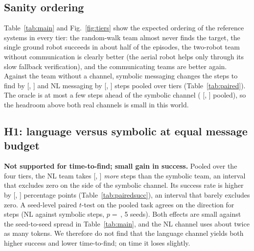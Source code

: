 \subsection{Sanity ordering}
Table~\ref{tab:main} and Fig.~\ref{fig:tiers} show the expected ordering of the reference systems in every tier: the random-walk team almost never finds the target, the single ground robot succeeds in about half of the episodes, the two-robot team without communication is clearly better (the aerial robot helps only through its slow fallback verification), and the communicating teams are better again. Against the team without a channel, symbolic messaging changes the steps to find by  [, ] and NL messaging by  [, ] steps pooled over tiers (Table~\ref{tab:paired}). The oracle is at most a few steps ahead of the symbolic channel ( [, ] pooled), so the headroom above both real channels is small in this world.

\subsection{H1: language versus symbolic at equal message budget}
\textbf{Not supported for time-to-find; small gain in success.} Pooled over the four tiers, the NL team takes  [, ] \emph{more} steps than the symbolic team, an interval that excludes zero on the side of the symbolic channel. Its success rate is higher by  [, ] percentage points (Table~\ref{tab:pairedsucc}), an interval that barely excludes zero. A seed-level paired $t$-test on the pooled task agrees on the direction for steps (NL  against symbolic  steps, $p=\,$, 5 seeds). Both effects are small against the seed-to-seed spread in Table~\ref{tab:main}, and the NL channel uses about twice as many tokens. We therefore do not find that the language channel yields both higher success and lower time-to-find; on time it loses slightly.

